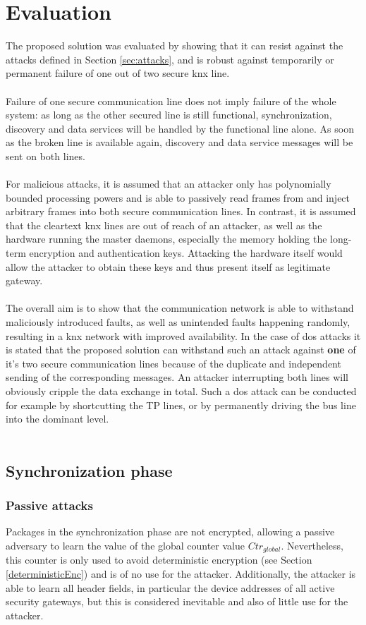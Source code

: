 \section{Evaluation}
The proposed solution was evaluated by showing that it can resist against the attacks defined in Section \ref{sec:attacks}, and is robust against temporarily or permanent 
failure of one out of two secure \gls{knx} line.
\\
\\
Failure of one secure communication line does not imply failure of the whole system: as long as the other secured line is still functional, synchronization, discovery and data services
will be handled by the functional line alone. As soon as the broken line is available again, discovery and data service messages will be sent on both lines.
\\
\\
For malicious attacks, it is assumed that an attacker only has polynomially bounded processing
powers and is able to passively read frames from and inject arbitrary frames into both secure communication lines. In contrast, it is assumed that the cleartext \gls{knx} lines are out 
of reach of an attacker, as well as the hardware running the master daemons, especially the memory holding the long-term encryption and authentication keys. Attacking the hardware
itself would allow the attacker to obtain these keys and thus present itself as legitimate gateway.
\\
\\
The overall aim is to show that the communication network is able to withstand maliciously introduced faults, as well as unintended faults happening randomly, resulting
in a \gls{knx} network with improved availability. In the case of \gls{dos} attacks it is stated that the proposed solution can withstand such an attack against \textbf{one} of it's
two secure communication lines because of the duplicate and independent sending of the corresponding messages. An attacker interrupting both lines will obviously cripple the 
data exchange in total. Such a \gls{dos} attack can be conducted for example by shortcutting the \gls{TP} lines, or by permanently driving the bus line into the dominant level.
\\
\\
\subsection{Synchronization phase}
\subsubsection{Passive attacks}
Packages in the synchronization phase are not encrypted, allowing a passive adversary to learn the value of the global counter value $Ctr_{global}$. Nevertheless,
this counter is only used to avoid deterministic encryption (see Section \ref{deterministicEnc}) and is of no use for the attacker.
Additionally, the attacker is able to learn all header fields, in particular the device addresses of all active security gateways, but this is considered inevitable and also of little
use for the attacker.

